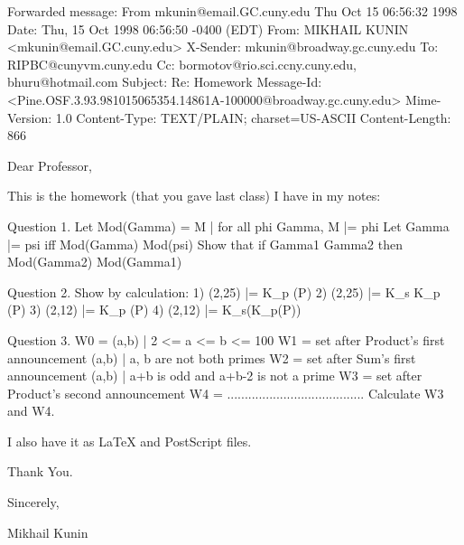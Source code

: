 Forwarded message:
From mkunin@email.GC.cuny.edu Thu Oct 15 06:56:32 1998
Date: Thu, 15 Oct 1998 06:56:50 -0400 (EDT)
From: MIKHAIL KUNIN <mkunin@email.GC.cuny.edu>
X-Sender: mkunin@broadway.gc.cuny.edu
To: RIPBC@cunyvm.cuny.edu
Cc: bormotov@rio.sci.ccny.cuny.edu, bhuru@hotmail.com
Subject: Re: Homework
Message-Id: <Pine.OSF.3.93.981015065354.14861A-100000@broadway.gc.cuny.edu>
Mime-Version: 1.0
Content-Type: TEXT/PLAIN; charset=US-ASCII
Content-Length: 866

Dear Professor,

This is the homework (that you gave last class) I have in my notes:

Question 1.
Let Mod(Gamma) = {M | for all phi \in Gamma, M |= phi}
Let Gamma |= psi iff Mod(Gamma) \subseteq Mod(psi)
Show that if Gamma1 \subseteq Gamma2 then Mod(Gamma2) \subseteq
Mod(Gamma1)

Question 2.
Show by calculation:
1) (2,25) |= K_p (\neg P)
2) (2,25) |= K_s K_p (\neg P)
3) (2,12) |= K_p (\neg P)
4) (2,12) |= \neg K_s(K_p(\neg P))

Question 3.
W0 = { (a,b) | 2 <= a <= b <= 100 }
W1 = set after Product's first announcement
        { (a,b) | a, b are not both primes }
W2 = set after Sum's first announcement
        { (a,b) | a+b is odd and a+b-2 is not a prime }
W3 = set after Product's second announcement
W4 = .......................................
Calculate W3 and W4.

I also have it as LaTeX and PostScript files.

Thank You.

Sincerely,

Mikhail Kunin





